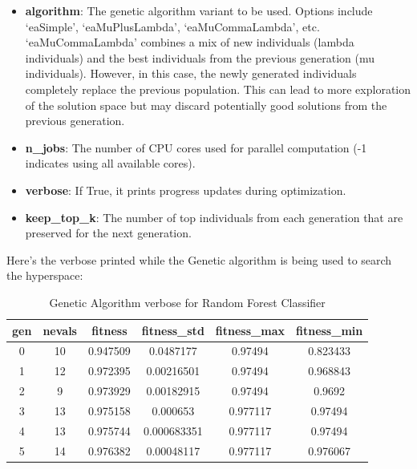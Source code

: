 \begin{itemize}
    \item \textbf{algorithm}: The genetic algorithm variant to be used. Options include `eaSimple', `eaMuPlusLambda', `eaMuCommaLambda', etc. `eaMuCommaLambda' combines a mix of new individuals (lambda individuals) and the best individuals from the previous generation (mu individuals). However, in this case, the newly generated individuals completely replace the previous population. This can lead to more exploration of the solution space but may discard potentially good solutions from the previous generation.
    \item \textbf{n\_jobs}: The number of CPU cores used for parallel computation (-1 indicates using all available cores).
    \item \textbf{verbose}: If True, it prints progress updates during optimization.
    \item \textbf{keep\_top\_k}: The number of top individuals from each generation that are preserved for the next generation.

\end{itemize}

Here's the verbose printed while the Genetic algorithm is being used to search the hyperspace:
\begin{table}[H]
\centering
\caption{Genetic Algorithm verbose for Random Forest Classifier}
\label{tab:RFCverbose}
\begin{tabular}{|c|c|c|c|c|c|}
\hline
gen & nevals & fitness & fitness\_std & fitness\_max & fitness\_min \\
\hline
0   & 10     & 0.947509 & 0.0487177   & 0.97494     & 0.823433    \\
1   & 12     & 0.972395 & 0.00216501  & 0.97494     & 0.968843    \\
2   & 9      & 0.973929 & 0.00182915  & 0.97494     & 0.9692      \\
3   & 13     & 0.975158 & 0.000653    & 0.977117    & 0.97494     \\
4   & 13     & 0.975744 & 0.000683351 & 0.977117    & 0.97494     \\
5   & 14     & 0.976382 & 0.00048117  & 0.977117    & 0.976067    \\
\hline
\end{tabular}
\end{table}

